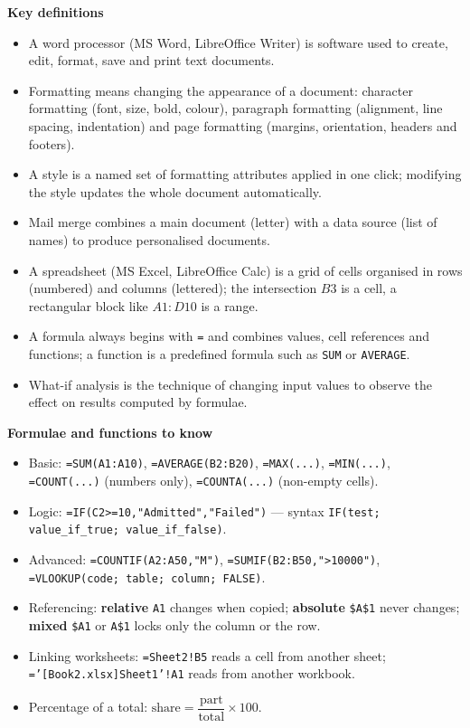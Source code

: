 \documentclass[11pt]{article}
\newcommand{\cle}[1]{{\popxbold\color{popdark}#1}}
\begin{document}
\begin{bilan}
\textbf{Key definitions}
\begin{itemize}
\item A \cle{word processor} (MS Word, LibreOffice Writer) is software used to create, edit, format, save and print text documents.
\item \cle{Formatting} means changing the appearance of a document: character formatting (font, size, bold, colour), paragraph formatting (alignment, line spacing, indentation) and page formatting (margins, orientation, headers and footers).
\item A \cle{style} is a named set of formatting attributes applied in one click; modifying the style updates the whole document automatically.
\item \cle{Mail merge} combines a main document (letter) with a data source (list of names) to produce personalised documents.
\item A \cle{spreadsheet} (MS Excel, LibreOffice Calc) is a grid of \cle{cells} organised in rows (numbered) and columns (lettered); the intersection $B3$ is a cell, a rectangular block like $A1:D10$ is a \cle{range}.
\item A \cle{formula} always begins with \texttt{=} and combines values, cell references and functions; a \cle{function} is a predefined formula such as \texttt{SUM} or \texttt{AVERAGE}.
\item \cle{What-if analysis} is the technique of changing input values to observe the effect on results computed by formulae.
\end{itemize}

\textbf{Formulae and functions to know}
\begin{itemize}
\item Basic: \texttt{=SUM(A1:A10)}, \texttt{=AVERAGE(B2:B20)}, \texttt{=MAX(...)}, \texttt{=MIN(...)}, \texttt{=COUNT(...)} (numbers only), \texttt{=COUNTA(...)} (non-empty cells).
\item Logic: \texttt{=IF(C2>=10,"Admitted","Failed")} --- syntax \texttt{IF(test; value\_if\_true; value\_if\_false)}.
\item Advanced: \texttt{=COUNTIF(A2:A50,"M")}, \texttt{=SUMIF(B2:B50,">10000")}, \texttt{=VLOOKUP(code; table; column; FALSE)}.
\item Referencing: \textbf{relative} \texttt{A1} changes when copied; \textbf{absolute} \texttt{\$A\$1} never changes; \textbf{mixed} \texttt{\$A1} or \texttt{A\$1} locks only the column or the row.
\item Linking worksheets: \texttt{=Sheet2!B5} reads a cell from another sheet; \texttt{='[Book2.xlsx]Sheet1'!A1} reads from another workbook.
\item Percentage of a total: $\text{share} = \dfrac{\text{part}}{\text{total}} \times 100$.
\end{itemize}


\end{bilan}
\end{document}

